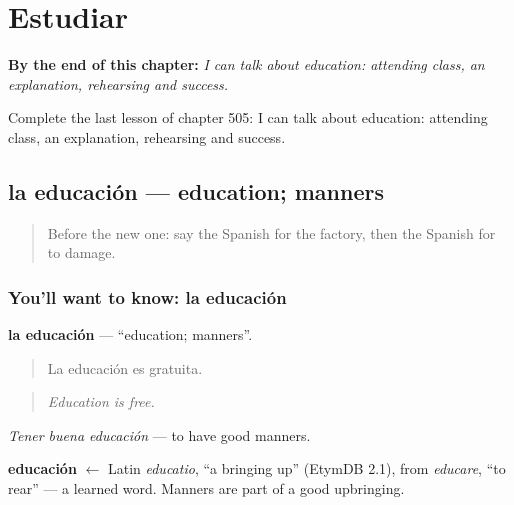 
\chapter{Estudiar}
\label{ch:es-estudiar}

\begin{chapteropening}
\textbf{By the end of this chapter:} \emph{I can talk about education: attending class, an explanation, rehearsing and success.}

Complete the last lesson of chapter 505: I can talk about education: attending class, an explanation, rehearsing and success.
\end{chapteropening}

\section[la educación]{la educación — education; manners}

\label{lesson:ES-C505-educacion}



\begin{quote}
Before the new one: say the Spanish for the factory, then the Spanish for to damage.
\end{quote}

\subsection*{You'll want to know: la educación}
\textbf{la educación} — \textquotedblleft{}education; manners\textquotedblright{}.

\begin{quote}
La educación es gratuita.
\end{quote}

\begin{quote}
\emph{Education is free.}
\end{quote}

\emph{Tener buena educación} — to have good manners.

\begin{cousinweb}
\textbf{educación} $\leftarrow$ Latin \emph{educatio}, \textquotedblleft{}a bringing up\textquotedblright{} (EtymDB 2.1), from \emph{educare}, \textquotedblleft{}to rear\textquotedblright{} — a learned word. Manners are part of a good upbringing.
\end{cousinweb}

